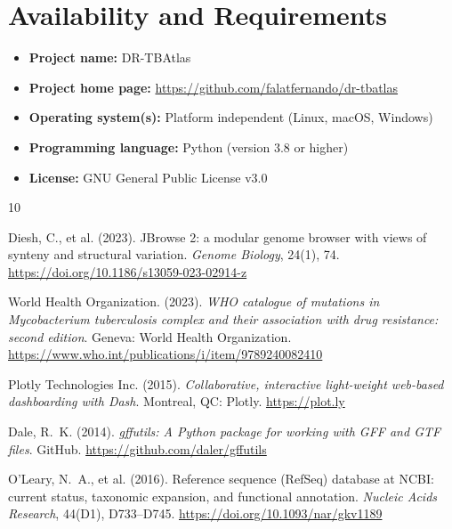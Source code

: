 \documentclass{article}
\begin{document}
\section{Availability and Requirements}
\begin{itemize}
    \item \textbf{Project name:} DR-TBAtlas
    \item \textbf{Project home page:} \url{https://github.com/falatfernando/dr-tbatlas}
    \item \textbf{Operating system(s):} Platform independent (Linux, macOS, Windows)
    \item \textbf{Programming language:} Python (version 3.8 or higher)
    \item \textbf{License:} GNU General Public License v3.0
\end{itemize}

\begin{thebibliography}{10}

Diesh, C., et al. (2023).
\newblock JBrowse 2: a modular genome browser with views of synteny and structural variation.
\newblock \emph{Genome Biology}, 24(1), 74.
\newblock \url{https://doi.org/10.1186/s13059-023-02914-z}

World Health Organization. (2023).
\newblock \emph{WHO catalogue of mutations in Mycobacterium tuberculosis complex and their association with drug resistance: second edition}.
\newblock Geneva: World Health Organization.
\newblock \url{https://www.who.int/publications/i/item/9789240082410}

Plotly Technologies Inc. (2015).
\newblock \emph{Collaborative, interactive light-weight web-based dashboarding with Dash}.
\newblock Montreal, QC: Plotly.
\newblock \url{https://plot.ly}

Dale, R.~K. (2014).
\newblock \emph{gffutils: A Python package for working with GFF and GTF files}.
\newblock GitHub.
\newblock \url{https://github.com/daler/gffutils}

O'Leary, N.~A., et al. (2016).
\newblock Reference sequence (RefSeq) database at NCBI: current status, taxonomic expansion, and functional annotation.
\newblock \emph{Nucleic Acids Research}, 44(D1), D733--D745.
\newblock \url{https://doi.org/10.1093/nar/gkv1189}

\end{thebibliography}
\end{document}
